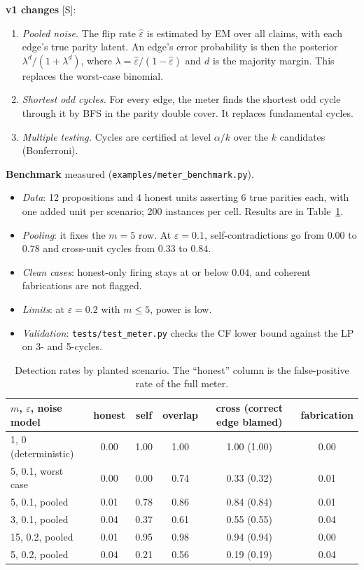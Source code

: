 \documentclass[11pt]{article}
\theoremstyle{definition}
\theoremstyle{remark}
\newcommand{\src}[1]{\textsf{\small[#1]}}
\newcommand{\st}[1]{\textsf{\small\color{gray}#1}}
\begin{document}
\textbf{v1 changes} \src{S}:
\begin{enumerate}
  \item \emph{Pooled noise.} The flip rate $\hat\varepsilon$ is estimated by EM over all claims, with each edge's true parity latent. An edge's error probability is then the posterior $\lambda^{d}/(1+\lambda^{d})$, where $\lambda=\hat\varepsilon/(1-\hat\varepsilon)$ and $d$ is the majority margin. This replaces the worst-case binomial.
  \item \emph{Shortest odd cycles.} For every edge, the meter finds the shortest odd cycle through it by BFS in the parity double cover. It replaces fundamental cycles.
  \item \emph{Multiple testing.} Cycles are certified at level $\alpha/k$ over the $k$ candidates (Bonferroni).
\end{enumerate}

\textbf{Benchmark} \st{measured} (\texttt{examples/meter\_benchmark.py}).
\begin{itemize}
  \item \emph{Data}: 12 propositions and 4 honest units asserting 6 true parities each, with one added unit per scenario; 200 instances per cell. Results are in Table~\ref{tab:meter}.
  \item \emph{Pooling}: it fixes the $m=5$ row. At $\varepsilon=0.1$, self-contradictions go from $0.00$ to $0.78$ and cross-unit cycles from $0.33$ to $0.84$.
  \item \emph{Clean cases}: honest-only firing stays at or below $0.04$, and coherent fabrications are not flagged.
  \item \emph{Limits}: at $\varepsilon=0.2$ with $m\le5$, power is low.
  \item \emph{Validation}: \texttt{tests/test\_meter.py} checks the CF lower bound against the LP on 3- and 5-cycles.
\end{itemize}
\begin{table}[h]\centering\small
\begin{tabular}{lccccc}
\toprule
$m$, $\varepsilon$, noise model & honest & self & overlap & cross (correct edge blamed) & fabrication\\
\midrule
1, 0 (deterministic) & 0.00 & 1.00 & 1.00 & 1.00 (1.00) & 0.00\\
5, 0.1, worst case & 0.00 & 0.00 & 0.74 & 0.33 (0.32) & 0.01\\
5, 0.1, pooled & 0.01 & 0.78 & 0.86 & 0.84 (0.84) & 0.01\\
3, 0.1, pooled & 0.04 & 0.37 & 0.61 & 0.55 (0.55) & 0.04\\
15, 0.2, pooled & 0.01 & 0.95 & 0.98 & 0.94 (0.94) & 0.00\\
5, 0.2, pooled & 0.04 & 0.21 & 0.56 & 0.19 (0.19) & 0.04\\
\bottomrule
\end{tabular}
\caption{Detection rates by planted scenario. The ``honest'' column is the false-positive rate of the full meter.}\label{tab:meter}
\end{table}
\end{document}
